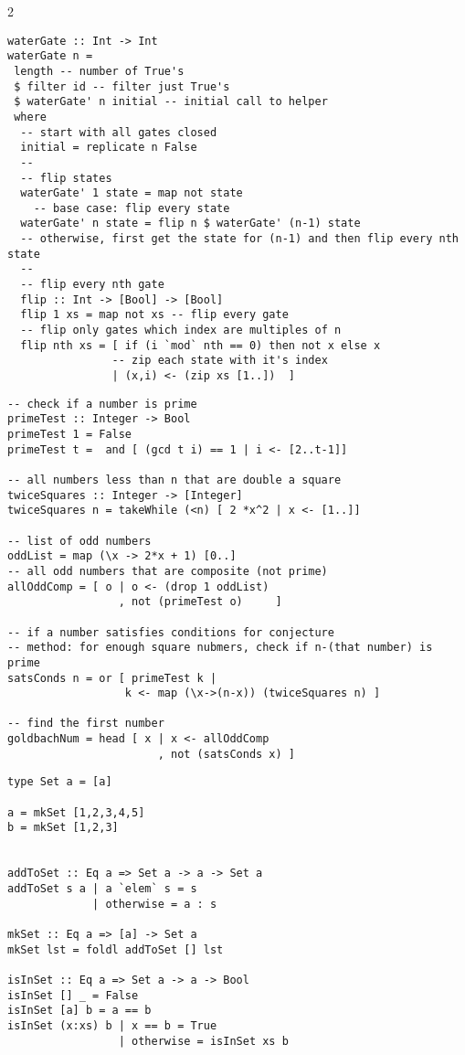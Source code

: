 \documentclass{article}
\def \columncount {2}
\begin{document}
\begin{multicols}{\columncount}
\begin{outline}[longenum]
\begin{verbatim}
waterGate :: Int -> Int
waterGate n =
 length -- number of True's
 $ filter id -- filter just True's
 $ waterGate' n initial -- initial call to helper
 where
  -- start with all gates closed
  initial = replicate n False
  --
  -- flip states
  waterGate' 1 state = map not state 
    -- base case: flip every state
  waterGate' n state = flip n $ waterGate' (n-1) state
  -- otherwise, first get the state for (n-1) and then flip every nth state
  --
  -- flip every nth gate
  flip :: Int -> [Bool] -> [Bool]
  flip 1 xs = map not xs -- flip every gate
  -- flip only gates which index are multiples of n
  flip nth xs = [ if (i `mod` nth == 0) then not x else x
                -- zip each state with it's index
                | (x,i) <- (zip xs [1..])  ]

\end{verbatim}

\begin{verbatim}
-- check if a number is prime
primeTest :: Integer -> Bool
primeTest 1 = False
primeTest t =  and [ (gcd t i) == 1 | i <- [2..t-1]]

-- all numbers less than n that are double a square
twiceSquares :: Integer -> [Integer]
twiceSquares n = takeWhile (<n) [ 2 *x^2 | x <- [1..]]

-- list of odd numbers
oddList = map (\x -> 2*x + 1) [0..]
-- all odd numbers that are composite (not prime)
allOddComp = [ o | o <- (drop 1 oddList)
                 , not (primeTest o)     ]

-- if a number satisfies conditions for conjecture
-- method: for enough square nubmers, check if n-(that number) is prime
satsConds n = or [ primeTest k | 
                  k <- map (\x->(n-x)) (twiceSquares n) ]

-- find the first number 
goldbachNum = head [ x | x <- allOddComp
                       , not (satsConds x) ]
\end{verbatim}


\begin{verbatim}
type Set a = [a]

a = mkSet [1,2,3,4,5]
b = mkSet [1,2,3]


addToSet :: Eq a => Set a -> a -> Set a
addToSet s a | a `elem` s = s
             | otherwise = a : s

mkSet :: Eq a => [a] -> Set a
mkSet lst = foldl addToSet [] lst

isInSet :: Eq a => Set a -> a -> Bool
isInSet [] _ = False
isInSet [a] b = a == b
isInSet (x:xs) b | x == b = True
                 | otherwise = isInSet xs b


\end{verbatim}
\end{outline}
\end{multicols}
\end{document}
